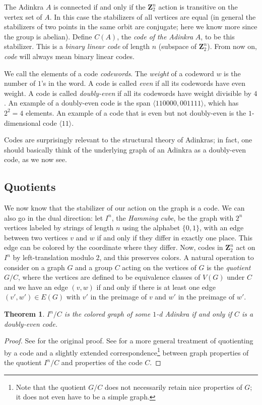 \documentclass[12pt,twoside,singlespace]{article}
\numberwithin{equation}{section}
\newtheorem{thm}[equation]{Theorem}
\theoremstyle{definition}
\newcommand{\ZZ}{\mathbf{Z}}
\begin{document}
The Adinkra $A$ is connected if and only if the $\ZZ_2^n$ action is transitive on the vertex set of $A$.  In this case the stabilizers of all vertices are equal (in general the stabilizers of two points in the same orbit are conjugate; here we know more since the group is abelian).  Define $C(A)$, the \emph{code of the Adinkra} $A$, to be this stabilizer.  This is a \emph{binary linear code} of length $n$ (subspace of $\ZZ_2^n$). From now on, \emph{code} will always mean binary linear codes.

We call the elements of a code  \emph{codewords}. The \emph{weight} of a codeword $w$ is the number of $1$'s in the word. A code is called \emph{even} if all its codewords have even weight. A code is called \emph{doubly-even} if all its codewords have weight divisible by $4$. An example of a doubly-even code is the span $\langle 110000, 001111\rangle$, which has $2^2 = 4$ elements. An example of a code that is even but not doubly-even is the $1$-dimensional code $\langle 11 \rangle$.

Codes are surprisingly relevant to the structural theory of Adinkras; in fact, one should basically think of the underlying graph of an Adinkra as a doubly-even code, as we now see.

\subsection{Quotients}
We now know that the stabilizer of our action on the graph is a code. We can also go in the dual direction: let $I^n$, the \emph{Hamming cube}, be the graph with $2^n$ vertices labeled by strings of length $n$ using the alphabet $\{0, 1\}$, with an edge between two vertices $v$ and $w$ if and only if they differ in exactly one place.  This edge can be colored by the coordinate where they differ.  Now, codes in $\ZZ_2^n$ act on $I^n$ by left-translation modulo $2$, and this preserves colors.  A natural operation to consider on a graph $G$ and a group $C$ acting on the vertices of $G$ is the \emph{quotient} $G/C$, where the vertices are defined to be equivalence classes of $V(G)$ under $C$ and we have an edge $(v,w)$ if and only if there is at least one edge $(v',w') \in E(G)$ with $v'$ in the preimage of $v$ and $w'$ in the preimage of $w'$. 

\begin{thm}
\label{thm:1d-quotients}
$I^n/C$ is the colored graph of some $1$-d Adinkra if and only if $C$ is a doubly-even code.
\end{thm}
\begin{proof}
See \cite{d2l:omni} for the original proof. See \cite{zhang:adinkras} for a more general treatment of quotienting by a code and a slightly extended correspondence\footnote{Note that the quotient $G/C$ does not necessarily retain nice properties of $G$; it does not even have to be a simple graph.} between graph properties of the quotient $I^n/C$ and properties of the code $C$.
\end{proof}
\end{document}
